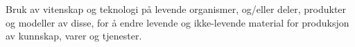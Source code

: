 \author{Viljar Johan Femoen}

\flushbottom
\maketitle
\thispagestyle{empty}
\vskip 20pt
\vskip 2pt
\noindent Bruk av vitenskap og teknologi på levende organismer, og/eller deler, 
produkter og modeller av disse, for å endre levende og ikke-levende material for produksjon av kunnskap, varer og tjenester.

\tableofcontents